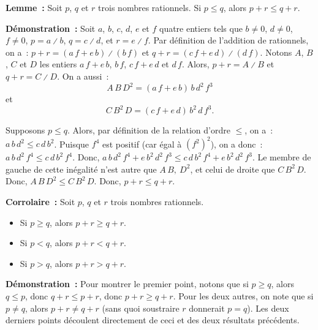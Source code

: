    \done

\medskip

\noindent\textbf{Lemme :} Soit $p$, $q$ et $r$ trois nombres rationnels.
    Si $p \leq q$, alors $p + r \leq q + r$.

\medskip

\noindent\textbf{Démonstration :} 
    Soit $a$, $b$, $c$, $d$, $e$ et $f$ quatre entiers tels que $b \neq 0$, $d \neq 0$, $f \neq 0$, $p = a \divslash b$, $q = c \divslash d$, et $r = e \divslash f$.
    Par définition de l'addition de rationnels, on a : $p + r = (a \, f + e \, b) \divslash (b \, f)$ et $q + r = (c \, f + e \, d) \divslash (d \, f)$.
    Notons $A$, $B$, $C$ et $D$ les entiers $a \, f + e \, b$, $b \, f$, $c \, f + e \, d$ et $d \, f$. 
    Alors, $p + r = A \divslash B$ et $q + r = C \divslash D$.
    On a aussi : 
    \begin{equation*}
        A \, B \, D^2 = (a \, f + e \, b) \, b \, d^2 \, f^3
    \end{equation*}
    et 
    \begin{equation*}
        C \, B^2 \, D = (c \, f + e \, d) \, b^2 \, d \, f^3.
    \end{equation*}

    Supposons $p \leq q$.
    Alors, par définition de la relation d'ordre $\leq$, on a : $a \, b \, d^2 \leq c \, d \, b^2$. 
    Puisque $f^4$ est positif (car égal à $(f^2)^2$), on a donc : $a \, b \, d^2 \, f^4 \leq c \, d \, b^2 \, f^4$.
    Donc, $a \, b \, d^2 \, f^4 + e \, b^2 \, d^2 \, f^3 \leq c \, d \, b^2 \, f^4 + e \, b^2 \, d^2 \, f^3$.
    Le membre de gauche de cette inégalité n'est autre que $A \, B ,\ D^2$, et celui de droite que $C \, B^2 \, D$.
    Donc, $A \, B \, D^2 \leq C \, B^2 \, D$.
    Donc, $p + r \leq q + r$.

    \done

\medskip

\noindent\textbf{Corrolaire :} Soit $p$, $q$ et $r$ trois nombres rationnels.
    \begin{itemize}[nosep]
        \item Si $p \geq q$, alors $p + r \geq q + r$.
        \item Si $p < q$, alors $p + r < q + r$.
        \item Si $p > q$, alors $p + r > q + r$.
    \end{itemize}

\medskip

\noindent\textbf{Démonstration :} 
    Pour montrer le premier point, notons que si $p \geq q$, alors $q \leq p$, donc $q + r \leq p + r$, donc $p + r \geq q + r$.
    Pour les deux autres, on note que si $p \neq q$, alors $p + r \neq q + r$ (sans quoi soustraire $r$ donnerait $p = q$). 
    Les deux derniers points découlent directement de ceci et des deux résultats précédents.

